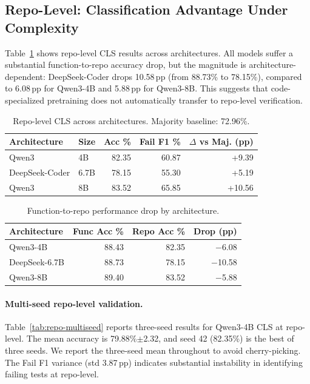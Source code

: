 \documentclass[11pt,a4paper]{article}
\begin{document}
\subsection{Repo-Level: Classification Advantage Under Complexity}

Table~\ref{tab:repo-cls} shows repo-level CLS results across architectures.
All models suffer a substantial function-to-repo accuracy drop, but the magnitude is architecture-dependent: DeepSeek-Coder drops 10.58\,pp (from 88.73\% to 78.15\%), compared to 6.08\,pp for Qwen3-4B and 5.88\,pp for Qwen3-8B.
This suggests that code-specialized pretraining does not automatically transfer to repo-level verification.

\begin{table}[t]
\centering
\small
\begin{tabular}{llrrr}
\toprule
\textbf{Architecture} & \textbf{Size} & \textbf{Acc \%} & \textbf{Fail F1 \%} & \textbf{$\Delta$ vs Maj. (pp)} \\
\midrule
Qwen3 & 4B & 82.35 & 60.87 & +9.39 \\
DeepSeek-Coder & 6.7B & 78.15 & 55.30 & +5.19 \\
Qwen3 & 8B & 83.52 & 65.85 & +10.56 \\
\bottomrule
\end{tabular}
\caption{Repo-level CLS across architectures. Majority baseline: 72.96\%.}
\label{tab:repo-cls}
\end{table}

\begin{table}[t]
\centering
\small
\begin{tabular}{lrrr}
\toprule
\textbf{Architecture} & \textbf{Func Acc \%} & \textbf{Repo Acc \%} & \textbf{Drop (pp)} \\
\midrule
Qwen3-4B & 88.43 & 82.35 & $-$6.08 \\
DeepSeek-6.7B & 88.73 & 78.15 & $-$10.58 \\
Qwen3-8B & 89.40 & 83.52 & $-$5.88 \\
\bottomrule
\end{tabular}
\caption{Function-to-repo performance drop by architecture.}
\label{tab:func-repo-drop}
\end{table}

\paragraph{Multi-seed repo-level validation.}
Table~\ref{tab:repo-multiseed} reports three-seed results for Qwen3-4B CLS at repo-level.
The mean accuracy is 79.88\%$\pm$2.32, and seed 42 (82.35\%) is the best of three seeds.
We report the three-seed mean throughout to avoid cherry-picking.
The Fail F1 variance (std 3.87\,pp) indicates substantial instability in identifying failing tests at repo-level.
\end{document}
